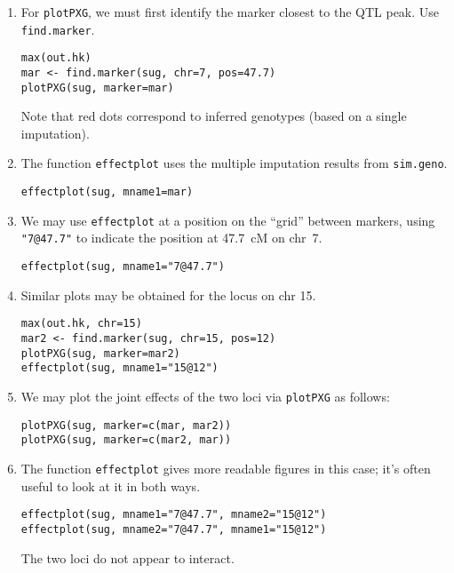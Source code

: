 \documentclass[10pt,letterpaper]{article}
\newcommand{\usercolor}{\color [named]{BlueViolet}}
\begin{document}
\begin{enumerate}
\addtocounter{enumi}{32}
\item For \verb-plotPXG-, we must first identify the marker closest
  to the QTL peak.  Use \verb-find.marker-.

\usercolor
\verb|max(out.hk)| \\
\verb|mar <- find.marker(sug, chr=7, pos=47.7)| \\
\verb|plotPXG(sug, marker=mar)|
\normalcolor

Note that red dots correspond to inferred genotypes (based on a single
imputation). 


\item The function \verb-effectplot- uses the multiple imputation
  results from \verb-sim.geno-.

\usercolor
\verb|effectplot(sug, mname1=mar)|
\normalcolor

\item We may use \verb-effectplot- at a position on the ``grid''
  between markers, using \verb-"7@47.7"- to indicate the position at
  47.7~cM on chr~7.

\usercolor
\verb|effectplot(sug, mname1="7@47.7")|
\normalcolor

\item Similar plots may be obtained for the locus on chr 15.

\usercolor
\verb|max(out.hk, chr=15)| \\
\verb|mar2 <- find.marker(sug, chr=15, pos=12)| \\
\verb|plotPXG(sug, marker=mar2)| \\
\verb|effectplot(sug, mname1="15@12")|
\normalcolor

\item We may plot the joint effects of the two loci via
  \verb-plotPXG- as follows:

\usercolor
\verb|plotPXG(sug, marker=c(mar, mar2))| \\
\verb|plotPXG(sug, marker=c(mar2, mar))|
\normalcolor

\item The function \verb-effectplot- gives more readable figures in
  this case; it's often useful to look at it in both ways.

\usercolor
\verb|effectplot(sug, mname1="7@47.7", mname2="15@12")| \\
\verb|effectplot(sug, mname2="7@47.7", mname1="15@12")| 
\normalcolor

The two loci do not appear to interact.


\end{enumerate}
\end{document}
